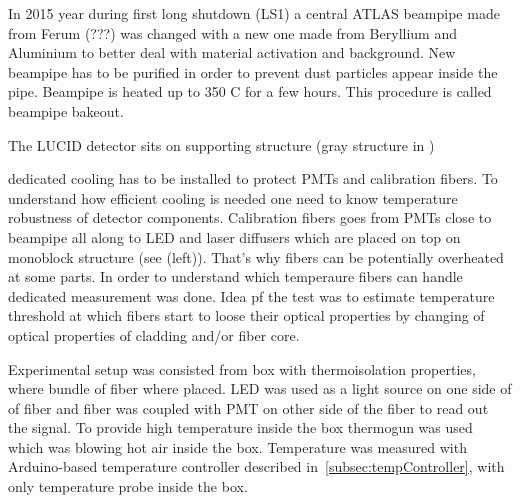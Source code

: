 In 2015 year during first long shutdown (LS1) a central ATLAS beampipe made from Ferum (???) 
was changed with a new one made from Beryllium and Aluminium to better deal with material activation and background.
New beampipe has to be purified in order to prevent dust particles appear inside the pipe.
Beampipe is heated up to 350 \degree C for a few hours. This procedure is called beampipe bakeout.

The LUCID detector sits on supporting structure (gray structure in )

dedicated cooling has to be installed to protect PMTs and calibration fibers.
To understand how efficient cooling is needed 
one need to know temperature robustness of detector components.
Calibration fibers goes from PMTs close to beampipe all along to LED and laser diffusers which are placed on top on monoblock structure 
(see  (left)).
That's why fibers can be potentially overheated at some parts. 
In order to understand which temperaure fibers can handle dedicated measurement was done. 
Idea pf the test was to estimate temperature threshold at which fibers start to loose their optical properties
by changing of optical properties of cladding and/or fiber core.

Experimental setup was consisted from box with thermoisolation properties, 
where bundle of fiber where placed.
LED was used as a light source on one side of of fiber and fiber was coupled with PMT on other side of the fiber to read out the signal.
To provide high temperature inside the box thermogun was used which was blowing hot air inside the box.
Temperature was measured with Arduino-based temperature controller described in~\ref{subsec:tempController}, with only temperature probe inside the box.

